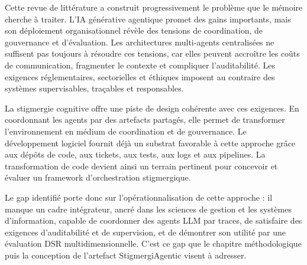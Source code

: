 Cette revue de littérature a construit progressivement le problème que le mémoire cherche à traiter. L'IA générative agentique promet des gains importants, mais son déploiement organisationnel révèle des tensions de coordination, de gouvernance et d'évaluation. Les architectures multi-agents centralisées ne suffisent pas toujours à résoudre ces tensions, car elles peuvent accroître les coûts de communication, fragmenter le contexte et compliquer l'auditabilité. Les exigences réglementaires, sectorielles et éthiques imposent au contraire des systèmes supervisables, traçables et responsables.

La stigmergie cognitive offre une piste de design cohérente avec ces exigences. En coordonnant les agents par des artefacts partagés, elle permet de transformer l'environnement en médium de coordination et de gouvernance. Le développement logiciel fournit déjà un substrat favorable à cette approche grâce aux dépôts de code, aux tickets, aux tests, aux logs et aux pipelines. La transformation de code devient ainsi un terrain pertinent pour concevoir et évaluer un framework d'orchestration stigmergique.

Le gap identifié porte donc sur l'opérationnalisation de cette approche : il manque un cadre intégrateur, ancré dans les sciences de gestion et les systèmes d'information, capable de coordonner des agents LLM par traces, de satisfaire des exigences d'auditabilité et de supervision, et de démontrer son utilité par une évaluation DSR multidimensionnelle. C'est ce gap que le chapitre méthodologique puis la conception de l'artefact StigmergiAgentic visent à adresser.
